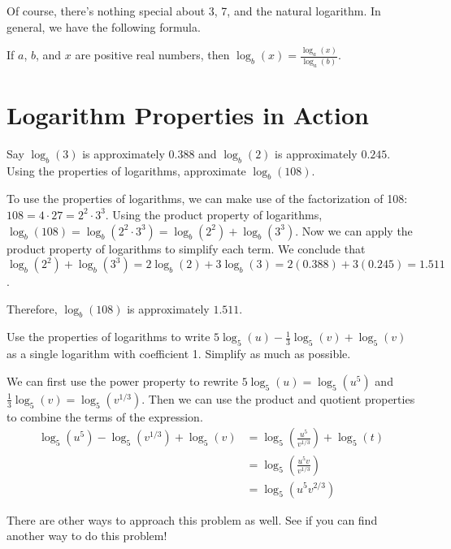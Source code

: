 \documentclass[nooutcomes]{ximera}
\begin{document}
Of course, there's nothing special about 3, 7, and the natural logarithm. In general, we have the following formula.
\begin{callout}
If $a$, $b$, and $x$ are positive real numbers, then $\log_b(x) = \frac{\log_a(x)}{\log_a(b)}$.
\end{callout}

\section{Logarithm Properties in Action}
\begin{example}
Say $\log_b(3)$ is approximately $0.388$ and $\log_b(2)$ is approximately $0.245$. Using the properties of logarithms, approximate $\log_b(108)$. 


	\begin{explanation}
	To use the properties of logarithms, we can make use of the factorization of 108: $108 = 4 \cdot 27 = 2^2 \cdot 3^3$. Using the product property of logarithms, $\log_b(108) = \log_b(2^2 \cdot 3^3) = \log_b(2^2) + \log_b(3^3)$. Now we can apply the product property of logarithms to simplify each term. We conclude that $\log_b(2^2) + \log_b(3^3) = 2\log_b(2) + 3\log_b(3) = 2(0.388) + 3(0.245) = 1.511$. 

Therefore, $\log_b(108)$ is approximately $1.511$. 
	\end{explanation}
\end{example}

\begin{example}
Use the properties of logarithms to write $5\log_5(u) - \frac{1}{3}\log_5(v) + \log_5(v)$ as a single logarithm with coefficient 1. Simplify as much as possible.

	\begin{explanation}
	We can first use the power property to rewrite $5\log_5(u) = \log_5(u^5)$ and $\frac{1}{3}\log_5(v) = \log_5(v^{1/3})$. Then we can use the product and quotient properties to combine the terms of the expression.
\begin{align*}
 \log_5(u^5) - \log_5(v^{1/3}) + \log_5(v) & = \log_5\left(\frac{u^5}{v^{1/3}}\right) + \log_5(t) \\
& = \log_5\left(\frac{u^5v}{v^{1/3}}\right) \\
& = \log_5(u^5v^{2/3})
\end{align*}

There are other ways to approach this problem as well. See if you can find another way to do this problem!
	\end{explanation}
\end{example}
\end{document}
